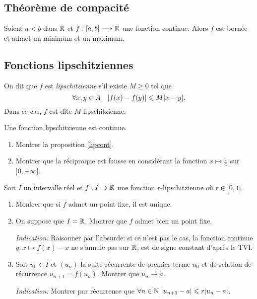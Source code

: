 \documentclass[../main.tex]{subfiles}
\begin{document}
\subsection{Théorème de compacité}

\begin{thm}
	Soient $a<b$ dans $\mathbb R$ et $f:[a,b]\longrightarrow\mathbb R$ une fonction continue. Alors $f$ est bornée et admet un minimum et un maximum.
\end{thm}

\subsection{Fonctions lipschitziennes}

\begin{mydef}
    On dit que $f$ est \textit{lipschitzienne} s'il existe $M\geq 0$ tel que
    \[
    \forall x,y\in A\quad
    \lvert f(x)-f(y)\rvert\leqslant M\lvert x-y\rvert.
    \]
    Dans ce cas, $f$ est dite $M$-lipschitzienne.
\end{mydef}

\begin{prop}\label{lipcont}
    Une fonction lipschitzienne est continue.
\end{prop}

\begin{exo}[M]\begin{enumerate}
    \item Montrer la proposition \ref{lipcont}.
    \item Montrer que la réciproque est fausse en considérant la fonction $x\mapsto \frac{1}{x}$ sur $]0,+\infty[$.
\end{enumerate}
\end{exo}

\begin{exo}
    Soit $I$ un intervalle réel et $f:I\rightarrow\mathbb R$ une fonction $r$-lipschitzienne où $r\in{[0,1[}$. \begin{enumerate}
        \item Montrer que si $f$ admet un point fixe, il est unique.
		\item On suppose que $I=\mathbb R$. Montrer que $f$ admet bien un point fixe.\par
		\textit{Indication:} Raisonner par l'absurde: si ce n'est pas le cas, la fonction continue $g:x\longmapsto f(x)-x$ ne s'annule pas sur $\mathbb R$, est de signe constant d'après le TVI.
        \item Soit $u_0\in I$ et $(u_n)$ la suite récurrente de premier terme $u_0$ et de relation de récurrence $u_{n+1}=f(u_n)$. Montrer que $u_n\longrightarrow a$.\par
        \textit{Indication:} Montrer par récurrence que $\forall n\in\mathbb N\ \lvert u_{n+1}-a\rvert\leqslant r\lvert u_n-a\rvert$.
    \end{enumerate} 
\end{exo}
\end{document}
